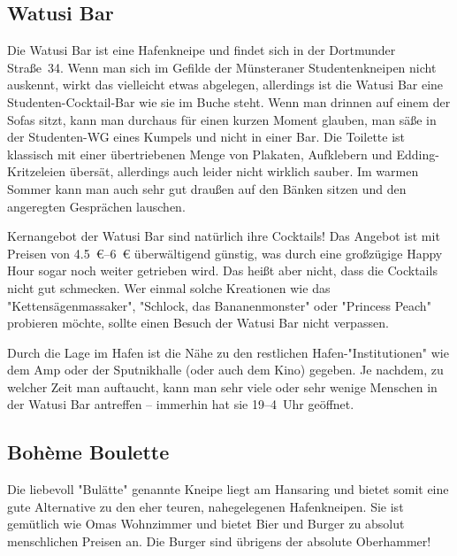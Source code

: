 {\begin{multicols*}{2}
\begin{center}
\end{center}

\subsection{Watusi Bar} %
Die Watusi Bar ist eine Hafenkneipe und findet sich in der Dortmunder Straße~34.
Wenn man sich im Gefilde der Münsteraner Studentenkneipen nicht auskennt, wirkt das vielleicht etwas abgelegen, allerdings ist die Watusi Bar eine Studenten-Cocktail-Bar wie sie im Buche steht.
Wenn man drinnen auf einem der Sofas sitzt, kann man durchaus für einen kurzen Moment glauben, man säße in der Studenten-WG eines Kumpels und nicht in einer Bar.
Die Toilette ist klassisch mit einer übertriebenen Menge von Plakaten, Aufklebern und Edding-Kritzeleien übersät, allerdings auch leider nicht wirklich sauber.
Im warmen Sommer kann man auch sehr gut draußen auf den Bänken sitzen und den angeregten Gesprächen lauschen.

Kernangebot der Watusi Bar sind natürlich ihre Cocktails!
Das Angebot ist mit Preisen von \SIrange{4,5}{6}{\euro} überwältigend günstig, was durch eine großzügige Happy Hour sogar noch weiter getrieben wird.
Das heißt aber nicht, dass die Cocktails nicht gut schmecken.
Wer einmal solche Kreationen wie das "Kettensägenmassaker", "Schlock, das Bananenmonster" oder "Princess Peach" probieren möchte, sollte einen Besuch der Watusi Bar nicht verpassen.

Durch die Lage im Hafen ist die Nähe zu den restlichen Hafen-"Institutionen" wie dem Amp oder der Sputnikhalle (oder auch dem Kino) gegeben.
Je nachdem, zu welcher Zeit man auftaucht, kann man sehr viele oder sehr wenige Menschen in der Watusi Bar antreffen -- immerhin hat sie 19--4~Uhr geöffnet.

\begin{center}
\end{center}

\subsection{Bohème Boulette}
Die liebevoll "Bulätte" genannte Kneipe liegt am Hansaring und bietet somit eine gute Alternative zu den eher teuren, nahegelegenen Hafenkneipen.
Sie ist gemütlich wie Omas Wohnzimmer und bietet Bier und Burger zu absolut menschlichen Preisen an.
Die Burger sind übrigens der absolute Oberhammer!


\end{multicols*}}
